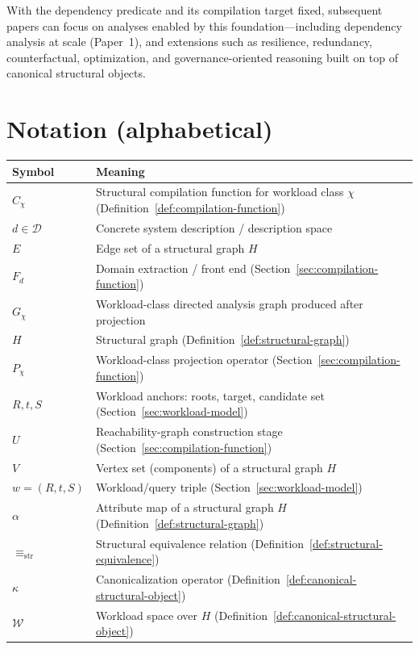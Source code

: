 \documentclass[11pt]{article}
\begin{document}
With the dependency predicate and its compilation target fixed, subsequent papers can focus on analyses enabled by this foundation---including dependency analysis at scale (Paper~1), and extensions such as resilience, redundancy, counterfactual, optimization, and governance-oriented reasoning built on top of canonical structural objects.
\appendix

\section{Notation (alphabetical)}
\label{app:notation}
\begin{table}[h]
\centering
\begin{tabular}{@{}ll@{}}
\toprule
Symbol & Meaning \\
\midrule
$C_\chi$ & Structural compilation function for workload class $\chi$ (Definition~\ref{def:compilation-function}) \\
$d\in\mathcal D$ & Concrete system description / description space \\
$E$ & Edge set of a structural graph $H$ \\
$F_d$ & Domain extraction / front end (Section~\ref{sec:compilation-function}) \\
$G_\chi$ & Workload-class directed analysis graph produced after projection \\
$H$ & Structural graph (Definition~\ref{def:structural-graph}) \\
$P_\chi$ & Workload-class projection operator (Section~\ref{sec:compilation-function}) \\
$R,t,S$ & Workload anchors: roots, target, candidate set (Section~\ref{sec:workload-model}) \\
$U$ & Reachability-graph construction stage (Section~\ref{sec:compilation-function}) \\
$V$ & Vertex set (components) of a structural graph $H$ \\
$w=(R,t,S)$ & Workload/query triple (Section~\ref{sec:workload-model}) \\
$\alpha$ & Attribute map of a structural graph $H$ (Definition~\ref{def:structural-graph}) \\
$\equiv_{\mathrm{str}}$ & Structural equivalence relation (Definition~\ref{def:structural-equivalence}) \\
$\kappa$ & Canonicalization operator (Definition~\ref{def:canonical-structural-object}) \\
$\mathcal W$ & Workload space over $H$ (Definition~\ref{def:canonical-structural-object}) \\

\end{tabular}
\end{table}
\end{document}
